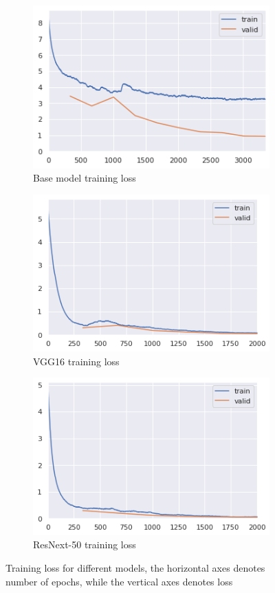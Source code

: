 \documentclass[12pt]{report}
\numberwithin{equation}{section}
\begin{document}
\begin{figure}[H]
\begin{subfigure}[t]{.5\textwidth}
\centering
\includegraphics[scale=0.6]{png/base_model_loss.png}
\caption{Base model training loss}
\label{subfig:base_loss}
\end{subfigure}
\hfill
\begin{subfigure}[t]{.5\textwidth}
\centering
\includegraphics[scale=0.6]{png/vgg_loss.png}
\caption{VGG16 training loss}
\label{subfig:vgg_loss}
\end{subfigure}
\medskip
\begin{subfigure}[t]{\textwidth}
\centering
\includegraphics[scale=0.6]{png/resnext_loss.png}
\caption{ResNext-50 training loss}
\label{subfig:resnext_loss}
\end{subfigure}
\caption[Training loss for different models]{Training loss for different models, the horizontal axes denotes number of epochs, while the vertical axes denotes loss}
\label{fig:models_loss}
\end{figure} \noindent
\end{document}
